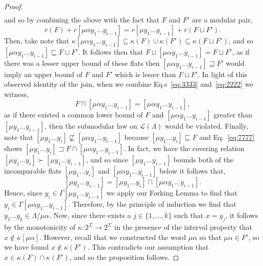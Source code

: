 \documentclass[11pt]{article}
\newcommand{\univ}{\Sigma}
\newcommand{\glang}{\Lambda}
\providecommand{\L}{}
\renewcommand{\L}{\mathscr{L}}
\begin{document}
\begin{proof}
\begin{align*}
    \end{align*}
    and so by combining the above with the fact that $F$ and $F'$ are a modular pair,
    \begin{equation}\label{eq:2222}
        r(F) + r[\mu\alpha y_1\ldots y_{i-1}] = r[\mu y_1 \ldots y_{i-1}] + r(F\sqcup F').
    \end{equation}
    Then, take note that $\kappa[\mu\alpha y_1\ldots y_{i-1}] \subseteq \kappa(F) \cup \kappa(F') \subseteq \kappa(F\sqcup F')$, and so $[\mu\alpha y_1\ldots y_{i-1}]\sqsubseteq F\sqcup F'$.
    It follows then that $F \sqcup [\mu\alpha y_1\ldots y_{i-1}] = F\sqcup F'$, as if there was a lesser upper bound of these flats then $[\mu \alpha y_1\ldots y_{i-1}] \sqsupseteq F'$ would imply an upper bound of $F$ and $F'$ which is lesser than $F\sqcup F'$.
    In light of this observed identity of the join, when we combine Eq.s~\ref{eq:3333} and~\ref{eq:2222} we witness,
    \begin{equation}\label{eq:7777}
        F\sqcap [\mu\alpha y_1\ldots y_{i-1}] = [\mu\alpha y_1\ldots y_{i-1}],
    \end{equation}
    as if there existed a common lower bound of $F$ and $[\mu\alpha y_1\ldots y_{i-1}]$ greater than $[\mu y_1\ldots y_{i-1}]$, then the submodular law on $\L(\glang)$ would be violated.
    Finally, note that $[\mu y_1 \ldots y_i] \not\sqsubseteq [\mu\alpha y_1\ldots y_{i-1}]$ because $[\mu y_1\ldots y_i] \sqsubseteq F$ and Eq.~\ref{eq:7777} shows $[\mu y_1\ldots y_i] \sqsupset F \sqcap [\mu\alpha y_1\ldots y_{i-1}]$.
    In fact, we have the covering relation $[\mu y_1 \ldots y_i] \succ [\mu y_1\ldots y_{i-1}]$,
    and so since $[\mu y_1\ldots y_{i-1}]$ bounds both of the incomparable flats $[\mu y_1\ldots y_i]$ and $[\mu \alpha y_1 \ldots y_{i-1}]$ below it follows that,
    \[
        [\mu y_1\ldots y_{i-1}] = [\mu y_1 \ldots y_i]\sqcap [\mu \alpha y_1 \ldots y_{i-1}].
    \]
    Hence, since $y_i \in \Gamma[\mu y_1\ldots y_{i-1}]$ we apply our Forking Lemma to find that $y_i \in \Gamma[\mu\alpha y_1\ldots y_{i-1}]$.
    Therefore, by the principle of induction we find that $y_1\ldots y_k \in \glang/\mu\alpha$.
    Now, since there exists a $j \in \{1,\ldots,k\}$ such that $x = y_j$, it follows by the monotonicity of $\kappa:2^\univ\to 2^\univ$ in the presence of the interval property that $x \notin \kappa[\mu\alpha]$.
    However, recall that we constructed the word $\mu\alpha$ so that $\mu\alpha \in F'$, so we have found $x \notin\kappa(F')$.
    This contradicts our assumption that $x \in \kappa(F)\cap\kappa(F')$, and so the proposition follows.
\end{proof}
\end{document}
